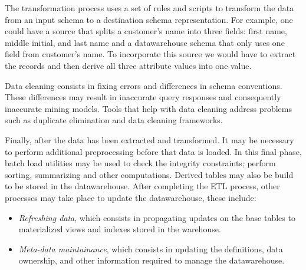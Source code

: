 \documentclass[]{article}
\begin{document}
The transformation process uses a set of rules and scripts to transform the data from an input schema to a destination schema
representation. For example, one could have a source that splits a customer's name into three fields: first name, middle
initial, and last name and a datawarehouse schema that only uses one field from customer's name. To incorporate this source
we would have to extract the records and then derive all three attribute values into one value.

Data cleaning consists in fixing errors and differences in schema conventions. These differences may result in inaccurate
query responses and consequently inaccurate mining models. Tools that help with data cleaning address problems such as
duplicate elimination and data cleaning frameworks.

Finally, after the data has been extracted and transformed. It may be necessary to perform additional preprocessing before that data is loaded. In this final
phase, batch load utilities may be used to check the integrity constraints; perform sorting, summarizing and other computations. Derived tables may also be build
to be stored in the datawarehouse. After completing the ETL process, other processes may take place to update the datawarehouse, these include: 
\begin{itemize} 
	\item \emph{Refreshing data}, which consists in propagating updates on the base tables to materialized views and indexes stored in the warehouse.
	\item \emph{Meta-data maintainance}, which consists in updating the definitions, data ownership, and other information required to manage the datawarehouse. 
\end{itemize}




\end{document}
